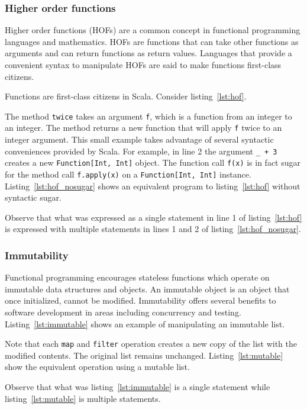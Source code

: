 \subsubsection{Higher order functions}
Higher order functions (HOFs) are a common concept in functional programming languages and mathematics.
HOFs are functions that can take other functions as arguments and can return functions as return values.
Languages that provide a convenient syntax to manipulate HOFs are said to make functions first-class citizens.

Functions are first-class citizens in Scala.
Consider listing~\ref{lst:hof}.

The method \texttt{twice} takes an argument \texttt{f}, which is a function from an integer to an integer.
The method returns a new function that will apply \texttt{f} twice to an integer argument.
This small example takes advantage of several syntactic conveniences provided by Scala.
For example, in line 2 the argument \texttt{\_ + 3} creates a new \texttt{Function[Int, Int]} object.
The function call \texttt{f(x)} is in fact sugar for the method call \texttt{f.apply(x)} on a \texttt{Function[Int, Int]} instance.
Listing~\ref{lst:hof_nosugar} shows an equivalent program to listing~\ref{lst:hof} without syntactic sugar.

Observe that what was expressed as a single statement in line 1 of listing~\ref{lst:hof} is expressed with multiple statements in lines 1 and 2 of listing~\ref{lst:hof_nosugar}.

\subsubsection{Immutability}
Functional programming encourages stateless functions which operate on immutable data structures and objects.
An immutable object is an object that once initialized, cannot be modified.
Immutability offers several benefits to software development in areas including concurrency and testing.
Listing~\ref{lst:immutable} shows an example of manipulating an immutable list.

Note that each \texttt{map} and \texttt{filter} operation creates a new copy of the list with the modified contents.
The original list remains unchanged.
Listing~\ref{lst:mutable} show the equivalent operation using a mutable list.

Observe that what was listing~\ref{lst:immutable} is a single statement while listing~\ref{lst:mutable} is multiple statements.

